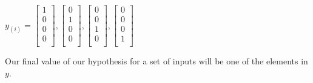 \documentclass{article}
\begin{document}
$
y_{(i)}=
\begin{bmatrix}
1 \\
0 \\
0 \\
0 \\
\end{bmatrix},
\begin{bmatrix}
0 \\
1 \\
0 \\
0 \\
\end{bmatrix},
\begin{bmatrix}
0 \\
0 \\
1 \\
0 \\
\end{bmatrix},
\begin{bmatrix}
0 \\
0 \\
0 \\
1 \\
\end{bmatrix}
$

Our final value of our hypothesis for a set of inputs will be one of the elements in $y$.
\end{document}
